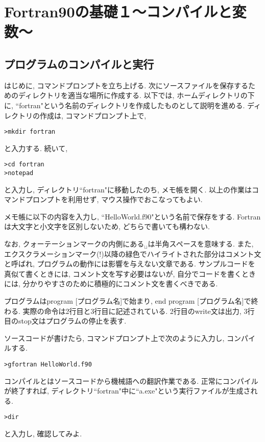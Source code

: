 \chapter{Fortran90の基礎１〜コンパイルと変数〜}

\section{プログラムのコンパイルと実行}
はじめに, コマンドプロンプトを立ち上げる.
次にソースファイルを保存するためのディレクトリを適当な場所に作成する.
以下では, ホームディレクトリの下に, ``fortran"という名前のディレクトリを作成したものとして説明を進める.
ディレクトリの作成は, コマンドプロンプト上で,
\begin{Verbatim}[frame=single]
>mkdir fortran
\end{Verbatim}
と入力する. 続いて,
\begin{Verbatim}[frame=single]
>cd fortran
>notepad
\end{Verbatim}
と入力し, ディレクトリ``fortran"に移動したのち, メモ帳を開く.
以上の作業はコマンドプロンプトを利用せず, マウス操作でおこなってもよい.
 
メモ帳に以下の内容を入力し, ``HelloWorld.f90"という名前で保存をする.
Fortranは大文字と小文字を区別しないため, どちらで書いても構わない.

なお, クォーテーションマークの内側にある$_{\sqcup}$は半角スペースを意味する.
また, エクスクラメーションマーク(!)以降の緑色でハイライトされた部分はコメント文と呼ばれ,
プログラムの動作には影響を与えない文章である.
サンプルコードを真似て書くときには, コメント文を写す必要はないが,
自分でコードを書くときには, 分かりやすさのために積極的にコメント文を書くべきである.

プログラムはprogram [プログラム名]で始まり, end program [プログラム名]で終わる.
実際の命令は2行目と3行目に記述されている.
2行目のwrite文は出力, 3行目のstop文はプログラムの停止を表す.


ソースコードが書けたら, コマンドプロンプト上で次のように入力し, コンパイルする.
\begin{Verbatim}[frame=single]
>gfortran HelloWorld.f90
\end{Verbatim}
コンパイルとはソースコードから機械語への翻訳作業である.
正常にコンパイルが終了すれば, ディレクトリ``fortran"中に``a.exe"という実行ファイルが生成される.
\begin{Verbatim}[frame=single]
>dir
\end{Verbatim}
と入力し, 確認してみよ.

